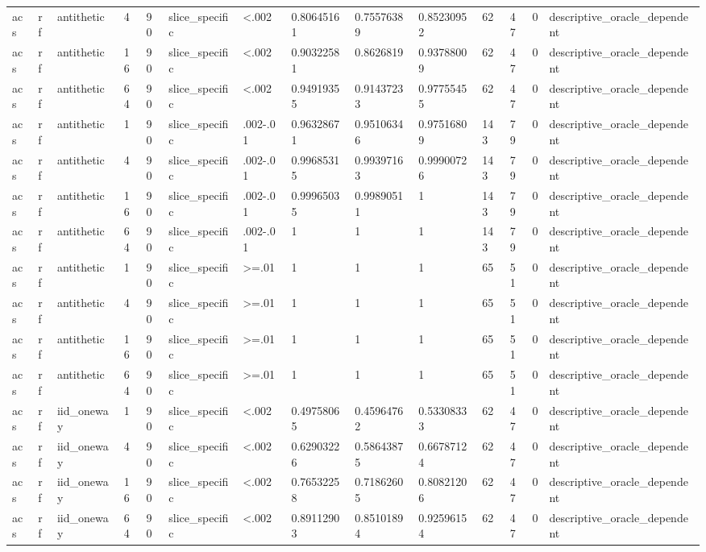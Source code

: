 \begin{tabular}{llllllllllllll}
acs & rf & antithetic & 4 & 90 & slice\_specific & <.002 & 0.80645161 & 0.75576389 & 0.85230952 & 62 & 47 & 0 & descriptive\_oracle\_dependent \\
acs & rf & antithetic & 16 & 90 & slice\_specific & <.002 & 0.90322581 & 0.8626819 & 0.93788009 & 62 & 47 & 0 & descriptive\_oracle\_dependent \\
acs & rf & antithetic & 64 & 90 & slice\_specific & <.002 & 0.94919355 & 0.91437233 & 0.97755455 & 62 & 47 & 0 & descriptive\_oracle\_dependent \\
acs & rf & antithetic & 1 & 90 & slice\_specific & .002-.01 & 0.96328671 & 0.95106346 & 0.97516809 & 143 & 79 & 0 & descriptive\_oracle\_dependent \\
acs & rf & antithetic & 4 & 90 & slice\_specific & .002-.01 & 0.99685315 & 0.99397163 & 0.99900726 & 143 & 79 & 0 & descriptive\_oracle\_dependent \\
acs & rf & antithetic & 16 & 90 & slice\_specific & .002-.01 & 0.99965035 & 0.99890511 & 1 & 143 & 79 & 0 & descriptive\_oracle\_dependent \\
acs & rf & antithetic & 64 & 90 & slice\_specific & .002-.01 & 1 & 1 & 1 & 143 & 79 & 0 & descriptive\_oracle\_dependent \\
acs & rf & antithetic & 1 & 90 & slice\_specific & >=.01 & 1 & 1 & 1 & 65 & 51 & 0 & descriptive\_oracle\_dependent \\
acs & rf & antithetic & 4 & 90 & slice\_specific & >=.01 & 1 & 1 & 1 & 65 & 51 & 0 & descriptive\_oracle\_dependent \\
acs & rf & antithetic & 16 & 90 & slice\_specific & >=.01 & 1 & 1 & 1 & 65 & 51 & 0 & descriptive\_oracle\_dependent \\
acs & rf & antithetic & 64 & 90 & slice\_specific & >=.01 & 1 & 1 & 1 & 65 & 51 & 0 & descriptive\_oracle\_dependent \\
acs & rf & iid\_oneway & 1 & 90 & slice\_specific & <.002 & 0.49758065 & 0.45964762 & 0.53308333 & 62 & 47 & 0 & descriptive\_oracle\_dependent \\
acs & rf & iid\_oneway & 4 & 90 & slice\_specific & <.002 & 0.62903226 & 0.58643875 & 0.66787124 & 62 & 47 & 0 & descriptive\_oracle\_dependent \\
acs & rf & iid\_oneway & 16 & 90 & slice\_specific & <.002 & 0.76532258 & 0.71862605 & 0.80821206 & 62 & 47 & 0 & descriptive\_oracle\_dependent \\
acs & rf & iid\_oneway & 64 & 90 & slice\_specific & <.002 & 0.89112903 & 0.85101894 & 0.92596154 & 62 & 47 & 0 & descriptive\_oracle\_dependent \\

\end{tabular}
